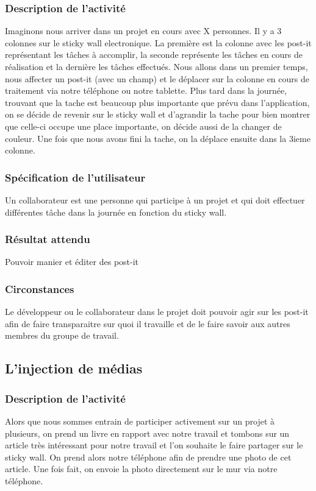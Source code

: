 \documentclass{article}
\begin{document}
\subsubsection{Description de l’activité}
Imaginons nous arriver dans un projet en cours avec X personnes. Il y a 3 colonnes sur le sticky wall electronique. La première est la colonne avec les post-it représentant les tâches à accomplir, la seconde représente les tâches en cours de réalisation et la dernière les tâches effectués. Nous allons dans un premier temps, nous affecter un post-it (avec un champ) et le déplacer sur la colonne en cours de traitement via notre téléphone ou notre tablette. Plus tard dans la journée, trouvant que la tache est beaucoup plus importante que prévu dans l'application, on se décide de revenir sur le sticky wall et d'agrandir la tache pour bien montrer que celle-ci occupe une place importante, on décide aussi de la changer de couleur. Une fois que nous avons fini la tache, on la déplace ensuite dans la 3ieme colonne.
\subsubsection{Spécification de l’utilisateur}
Un collaborateur est une personne qui participe à un projet et qui doit effectuer différentes tâche dans la journée en fonction du sticky wall.
\subsubsection{Résultat attendu}
Pouvoir manier et éditer des post-it
\subsubsection{Circonstances}
Le développeur ou le collaborateur dans le projet doit pouvoir agir sur les post-it afin de faire transparaitre sur quoi il travaille et de le faire savoir aux autres membres du groupe de travail.

\subsection{L'injection de médias}
\subsubsection{Description de l’activité}
Alors que nous sommes entrain de participer activement sur un projet à plusieurs, on prend un livre en rapport avec notre travail et tombons sur un article très intéressant pour notre travail et l'on souhaite le faire partager sur le sticky wall. On prend alors notre téléphone afin de prendre une photo de cet article. Une fois fait, on envoie la photo directement sur le mur via notre téléphone.
\end{document}

